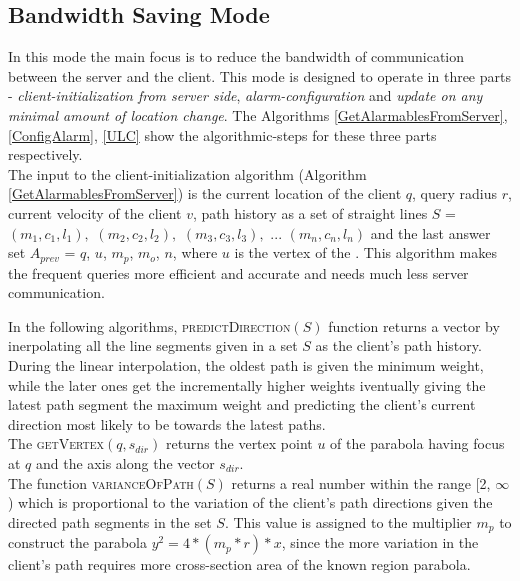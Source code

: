 \subsection{Bandwidth Saving Mode}
In this mode the main focus is to reduce the bandwidth of communication between the server and the client. This mode is designed to operate in three parts - \textit{client-initialization from server side}, \textit{alarm-configuration} and \textit{update on any minimal amount of location change}. The Algorithms \ref{GetAlarmablesFromServer}, \ref{ConfigAlarm}, \ref{ULC} show the algorithmic-steps for these three parts respectively.\\

The input to the client-initialization algorithm (Algorithm \ref{GetAlarmablesFromServer}) is the current location of the client $q$, query radius $r$, current velocity of the client $v$, path history as a set of straight lines $S$ = {$(m_1, c_1, l_1),$ $(m_2, c_2, l_2),$ $(m_3, c_3, l_3),$ ... $(m_n, c_n, l_n)$} and the last answer set $A_{prev}$ = {$q$, $u$, $m_p$, $m_o$, $n$}, where $u$ is the vertex of the . This algorithm makes the frequent queries more efficient and accurate and needs much less server communication.


In the following algorithms, \textsc{predictDirection}$(S)$ function returns a vector by inerpolating all the line segments given in a set $S$ as the client's path history. During the linear interpolation, the oldest path is given the minimum weight, while the later ones get the incrementally higher weights iventually giving the latest path segment the maximum weight and predicting the client's current direction most likely to be towards the latest paths.\\

The \textsc{getVertex}$(q, s_{dir})$ returns the vertex point $u$ of the parabola having focus at $q$ and the axis along the vector $s_{dir}$.\\

The function \textsc{varianceOfPath}$(S)$ returns a real number within the range [2, $\infty$) which is proportional to the variation of the client's path directions given the directed path segments in the set $S$. This value is assigned to the multiplier $m_p$ to construct the parabola $y^2 = 4*(m_p*r)*x$, since the more variation in the client's path requires more cross-section area of the known region parabola.\\


